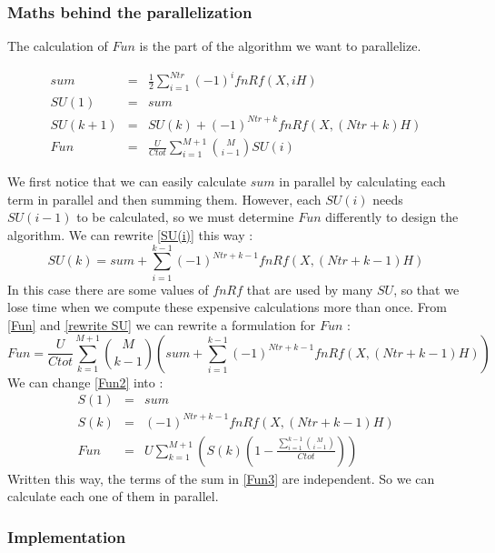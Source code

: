 \documentclass[11pt,a4paper]{article}
\begin{document}
\subsubsection*{Maths behind the parallelization}

The calculation of $Fun$ is the part of the algorithm we want to parallelize.

\begin{eqnarray}
	sum &=& \frac{1}{2}   \sum_{i=1}^{Ntr} (-1)^{i}fnRf(X,iH)\\
	SU(1) &=& sum  \\
	SU(k + 1) &=& SU(k) + (-1)^{Ntr+k}fnRf(X,(Ntr + k)H) \label{SU(i)}\\
	Fun &=&\frac{U}{Ctot} \sum_{i=1}^{M+1} \binom{M}{i-1}SU(i) \label{Fun}
\end{eqnarray}

We first notice that we can easily calculate $sum$ in parallel by calculating each term in parallel and then summing them. However, each $SU(i)$ needs $SU(i-1)$ to be calculated, so we must determine $Fun$ differently to design the algorithm.
We can rewrite \eqref{SU(i)} this way :
\begin{equation}
	SU(k) = sum + \sum_{i=1}^{k-1} (-1)^{Ntr+k-1}fnRf(X,(Ntr + k-1)H)
	\label{rewrite SU}
\end{equation}
In this case there are some values of $fnRf$ that are used by many $SU$, so that we lose time when we compute these expensive calculations more than once.
From \eqref{Fun} and \eqref{rewrite SU} we can rewrite a formulation for $Fun$ :
\begin{equation}
	Fun =\displaystyle{ \frac{U}{Ctot}  \sum_{k=1}^{M+1} \binom{M}{k-1}\left(sum + \sum_{i=1}^{k-1} (-1)^{Ntr+k-1}fnRf(X,(Ntr + k-1)H)\right)}
	\label{Fun2}
\end{equation}
We can change \eqref{Fun2} into :
\begin{eqnarray}
	S(1) &=& sum\\
	S(k) &=& (-1)^{Ntr+k-1}fnRf(X,(Ntr + k-1)H)\\
	Fun &=& \displaystyle{U \sum_{k=1}^{M+1}\left(S(k)(1-\frac{ \sum_{i=1}^{k-1} \binom{M}{i-1}}{Ctot})\right)} \label{Fun3}
\end{eqnarray}
Written this way, the terms of the sum in \eqref{Fun3} are independent. So we can calculate each one of them in parallel.

\subsubsection*{Implementation}
\end{document}
